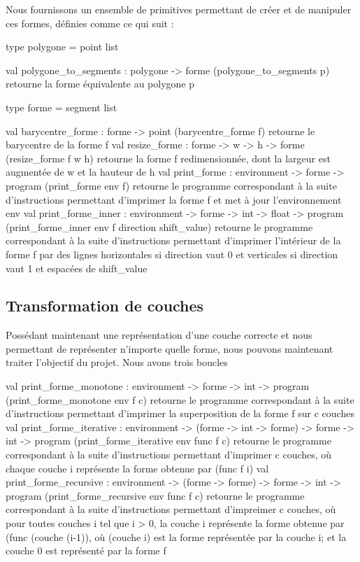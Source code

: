 \documentclass[11pt, titlepage]{article}
\begin{document}
Nous fournissons un ensemble de primitives permettant de créer et de manipuler ces formes, définies comme ce qui suit :
\begin{lstisting}
type polygone = point list

val polygone_to_segments : polygone -> forme
(polygone_to_segments p) retourne la forme équivalente au polygone p

type forme = segment list

val barycentre_forme : forme -> point
(barycentre_forme f) retourne le barycentre de la forme f
val resize_forme : forme -> w -> h -> forme
(resize_forme f w h) retourne la forme f redimensionnée, dont la largeur est augmentée de w et la hauteur de h
val print_forme : environment -> forme -> program
(print_forme env f) retourne le programme correspondant à la suite d'instructions permettant d'imprimer la forme f et met à jour l'environnement env
val print_forme_inner : environment -> forme -> int -> float -> program
(print_forme_inner env f direction shift_value) retourne le programme correspondant à la suite d'instructions permettant d'imprimer l'intérieur de la forme f par des lignes horizontales si direction vaut 0 et verticales si direction vaut 1 et espacées de shift_value
\end{lstisting}

\subsection{Transformation de couches}
Possédant maintenant une représentation d'une couche correcte et nous permettant de représenter n'importe quelle forme, nous pouvons maintenant traiter l'objectif du projet.
Nous avons trois boucles

\begin{lstisting}
val print_forme_monotone : environment -> forme -> int -> program
(print_forme_monotone env f c) retourne le programme correspondant à la suite d'instructions permettant d'imprimer la superposition de la forme f sur c couches
val print_forme_iterative : environment -> (forme -> int -> forme) -> forme -> int -> program
(print_forme_iterative env func f c) retourne le programme correspondant à la suite d'instructions permettant d'imprimer c couches, où chaque couche i représente la forme obtenue par (func f i)
val print_forme_recursive : environment -> (forme -> forme) -> forme -> int -> program
(print_forme_recursive env func f c) retourne le programme correspondant à la suite d'instructions permettant d'impreimer c couches, où pour toutes couches i tel que i > 0, la couche i représente la forme obtenue par (func (couche (i-1)), où (couche i) est la forme représentée par la couche i; et la couche 0 est représenté par la forme f
\end{lstisting}
\newpage
\end{document}
